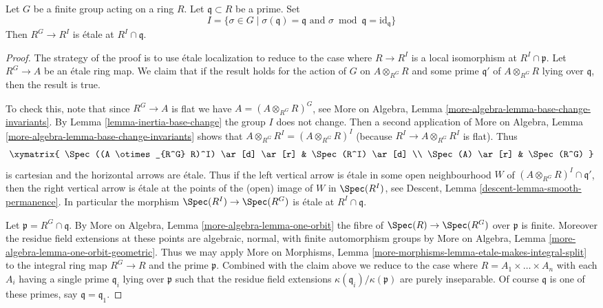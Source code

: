 %
\begin{lemma}
\label{lemma-inertia-invariants-etale}
Let $G$ be a finite group acting on a ring $R$. Let $\mathfrak q \subset R$
be a prime. Set
$$
I = \{\sigma \in G \mid \sigma(\mathfrak q) = \mathfrak q
\text{ and } \sigma \bmod \mathfrak q = \text{id}_\mathfrak q\}
$$
Then $R^G \to R^I$ is \'etale at $R^I \cap \mathfrak q$.
\end{lemma}

\begin{proof}
The strategy of the proof is to use \'etale localization to
reduce to the case where $R \to R^I$ is a local isomorphism at
$R^I \cap \mathfrak p$.
Let $R^G \to A$ be an \'etale ring map. We claim that if the result
holds for the action of $G$ on $A \otimes_{R^G} R$ and some prime
$\mathfrak q'$ of $A \otimes_{R^G} R$ lying over $\mathfrak q$, then
the result is true.

\medskip\noindent
To check this, note that since $R^G \to A$ is flat we have
$A = (A \otimes_{R^G} R)^G$, see More on Algebra,
Lemma \ref{more-algebra-lemma-base-change-invariants}.
By Lemma \ref{lemma-inertia-base-change} the group $I$ does not change.
Then a second application of More on Algebra,
Lemma \ref{more-algebra-lemma-base-change-invariants}
shows that $A \otimes_{R^G} R^I = (A \otimes_{R^G} R)^I$
(because $R^I \to A \otimes_{R^G} R^I$ is flat).
Thus
$$
\xymatrix{
\Spec((A \otimes_{R^G} R)^I) \ar[d] \ar[r] & \Spec(R^I) \ar[d] \\
\Spec(A) \ar[r] & \Spec(R^G)
}
$$
is cartesian and the horizontal arrows are \'etale. Thus if the
left vertical arrow is \'etale in some open neighbourhood $W$ of
$(A \otimes_{R^G} R)^I \cap \mathfrak q'$, then the right vertical
arrow is \'etale at the points of the (open) image of $W$ in
$\Spec(R^I)$, see
Descent, Lemma \ref{descent-lemma-smooth-permanence}. In particular
the morphism $\Spec(R^I) \to \Spec(R^G)$ is \'etale at $R^I \cap \mathfrak q$.

\medskip\noindent
Let $\mathfrak p = R^G \cap \mathfrak q$.
By More on Algebra, Lemma \ref{more-algebra-lemma-one-orbit}
the fibre of $\Spec(R) \to \Spec(R^G)$ over $\mathfrak p$ is
finite. Moreover the residue field extensions at these points
are algebraic, normal, with finite automorphism groups by
More on Algebra, Lemma \ref{more-algebra-lemma-one-orbit-geometric}.
Thus we may apply
More on Morphisms,
Lemma \ref{more-morphisms-lemma-etale-makes-integral-split}
to the integral ring map $R^G \to R$ and the prime $\mathfrak p$.
Combined with the claim above we reduce to the case where
$R = A_1 \times \ldots \times A_n$ with each $A_i$ having a single
prime $\mathfrak q_i$ lying over $\mathfrak p$ such that the
residue field extensions $\kappa(\mathfrak q_i)/\kappa(\mathfrak p)$
are purely inseparable. Of course $\mathfrak q$ is one of
these primes, say $\mathfrak q = \mathfrak q_1$.


\end{proof}
